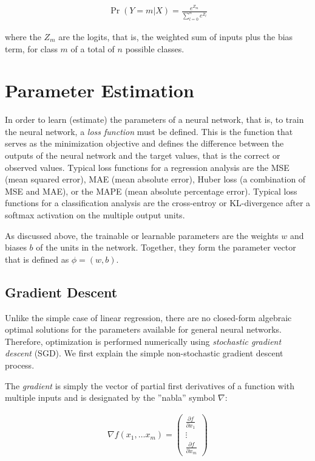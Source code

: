 \begin{align*}
\Pr(Y=m|X) = \frac{e^{Z_m}}{\sum_{l=0}^n e^{Z_l}}
\end{align*}

\noindent where the $Z_m$ are the logits, that is, the weighted sum of inputs plus the bias term, for class $m$ of a total of $n$ possible classes.

\section{Parameter Estimation}

In order to learn (estimate) the parameters of a neural network, that is, to train the neural network, a \emph{loss function} must be defined. This is the function that serves as the minimization objective and defines the difference between the outputs of the neural network and the target values, that is the correct or observed values. Typical loss functions for a regression analysis are the MSE (mean squared error), MAE (mean absolute error), Huber loss (a combination of MSE and MAE), or the MAPE (mean absolute percentage error). Typical loss functions for a classification analysis are the cross-entroy or KL-divergence after a softmax activation on the multiple output units. 

As discussed above, the trainable or learnable parameters are the weights $w$ and biases $b$ of the units in the network. Together, they form the parameter vector that is defined as $\phi = (w, b)$.

\subsection{Gradient Descent}

Unlike the simple case of linear regression, there are no closed-form algebraic optimal solutions for the parameters available for general neural networks. Therefore, optimization is performed numerically using \emph{stochastic gradient descent} (SGD). We first explain the simple non-stochastic gradient descent process. 

The \emph{gradient} is simply the vector of partial first derivatives of a function with multiple inputs and is designated by the ''nabla'' symbol $\nabla$:

\begin{align*}
\nabla f(x_1, \ldots x_m) = \begin{pmatrix} 
\frac{\partial f}{\partial x_1} \\
\vdots \\
\frac{\partial f}{\partial x_m} \end{pmatrix}
\end{align*}

